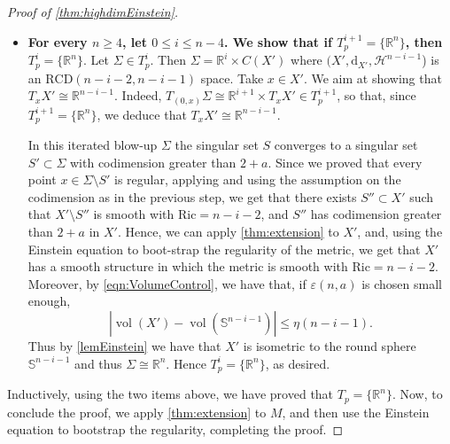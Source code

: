 \documentclass[12pt,a4paper,reqno]{amsart}
\renewcommand{\leq}{\leqslant}
\renewcommand{\geq}{\geqslant}
\DeclareMathOperator{\vol}{vol}
\begin{document}
\begin{proof}[Proof of \cref{thm:highdimEinstein}]
\begin{itemize}
    Since $X'$ is $2$-dimensional, the assumption on the codimension of $S'$ being greater than $2+a$, together with the fact that $\Sigma\setminus S'$ is smooth and Ricci flat, implies that $X'$ is in fact smooth and has constant sectional curvature equal to $1$. Thus $X'$ is isometric to either $\mathbb R\mathbb P^2$ or $\mathbb S^2$. The former is excluded for $\varepsilon$ small enough due to \eqref{eqn:VolumeControl}\footnote{For this step, it is enough to use that $g$ is $L^\infty$, compare the beginning of the proof of \cref{thm:4dEinstein}.}. Hence $X'\cong\mathbb S^2$ and thus $\Sigma=\mathbb R^n$, as desired.
    \item \textbf{For every $n\geq 4$, let $0\leq i \leq n-4$. We show that if $T_p^{i+1}=\{\mathbb R^n\}$, then $T_p^{i}=\{\mathbb R^n\}$}. Let $\Sigma\in T_p^i$. Then $\Sigma=\mathbb R^{i}\times C(X')$ where  $(X',\mathrm{d}_{X'},\mathcal{H}^{n-i-1}$) is an $\mathrm{RCD}(n-i-2,n-i-1)$ space. Take $x\in X'$. We aim at showing that $T_xX'\cong\mathbb R^{n-i-1}$. Indeed, $T_{(0,x)}\Sigma\cong\mathbb R^{i+1}\times T_xX'\in T_p^{i+1}$, so that, since $T_p^{i+1}=\{\mathbb R^n\}$, we deduce that $T_xX'\cong \mathbb R^{n-i-1}$. 

    In this iterated blow-up $\Sigma$ the singular set $S$ converges to a singular set $S'\subset \Sigma$ with codimension greater than $2+a$. Since we proved that every point $x\in \Sigma\setminus S'$ is regular, applying \cite{CNAnnMath} and using the assumption on the codimension as in the previous step, we get that there exists $S''\subset X'$ such that $X'\setminus S''$ is smooth with $\mathrm{Ric}=n-i-2$, and $S''$ has codimension greater than $2+a$ in $X'$. Hence, we can apply \cref{thm:extension} to $X'$, and, using the Einstein equation to boot-strap the regularity of the metric, we get that $X'$ has a smooth structure in which the metric is smooth with $\mathrm{Ric}=n-i-2$. Moreover, by \eqref{eqn:VolumeControl}, we have that, if $\varepsilon(n,a)$ is chosen small enough, 
    \[
    |\vol(X')-\vol(\mathbb S^{n-i-1})|\leq \eta(n-i-1).
    \]
    Thus by \cref{lemEinstein} we have that $X'$ is isometric to the round sphere $\mathbb S^{n-i-1}$ and thus $\Sigma\cong \mathbb R^n$. Hence $T_p^i=\{\mathbb R^n\}$, as desired.
\end{itemize}

Inductively, using the two items above, we have proved that $T_p=\{\mathbb R^n\}$. Now, to conclude the proof, we apply \cref{thm:extension} to $M$, and then use the Einstein equation to bootstrap the regularity, completing the proof.
\end{proof}
\end{document}
